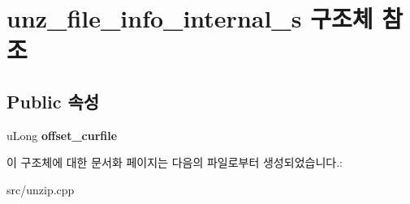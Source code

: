 \hypertarget{structunz__file__info__internal__s}{}\section{unz\+\_\+file\+\_\+info\+\_\+internal\+\_\+s 구조체 참조}
\label{structunz__file__info__internal__s}
\subsection*{Public 속성}
\begin{DoxyCompactItemize}
\item 
\mbox{\label{structunz__file__info__internal__s_a23d3a1c3584888bdf066d7bfed95f62e}} 
u\+Long {\bfseries offset\+\_\+curfile}
\end{DoxyCompactItemize}


이 구조체에 대한 문서화 페이지는 다음의 파일로부터 생성되었습니다.\+:\begin{DoxyCompactItemize}
\item 
src/unzip.\+cpp\end{DoxyCompactItemize}

